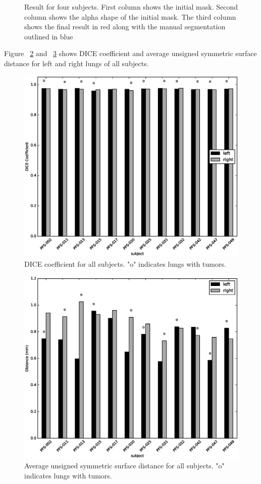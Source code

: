 \documentclass{llncs}
\begin{document}
\begin{figure}[t]
  \caption{Result for four subjects. First column shows the initial mask. Second column shows the alpha shape of the initial mask. The third column shows the final result in red along with the manual segmentation outlined in blue}
  \label{fig:resultseg}
\end{figure}

Figure ~\ref{fig:dice} and ~\ref{fig:dist} shows DICE coefficient and average unsigned symmetric surface distance for left and right lungs of all subjects.
\begin{figure}[t]
  \centering
    \includegraphics[width=4.5in]{figs/dice}
  \caption{DICE coefficient for all subjects. "o" indicates lungs with tumors.}
  \label{fig:dice}
\end{figure}

\begin{figure}[t]
  \centering
    \includegraphics[width=4.5in]{figs/distUnsignSym}
  \caption{Average unsigned symmetric surface distance for all subjects. "o" indicates lungs with tumors.}
  \label{fig:dist}
\end{figure}
\end{document}
